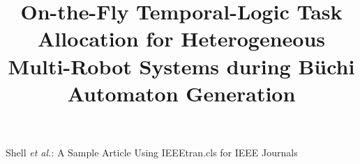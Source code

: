 \documentclass[lettersize,journal]{IEEEtran}
\theoremstyle{italiclemma}
\theoremstyle{italiclemma}
\theoremstyle{definition}
\begin{document}
\title{On-the-Fly Temporal-Logic Task Allocation for Heterogeneous Multi-Robot Systems during B\"uchi Automaton Generation}

%
{Shell \MakeLowercase{\textit{et al.}}: A Sample Article Using IEEEtran.cls for IEEE Journals}


\maketitle
\end{document}
